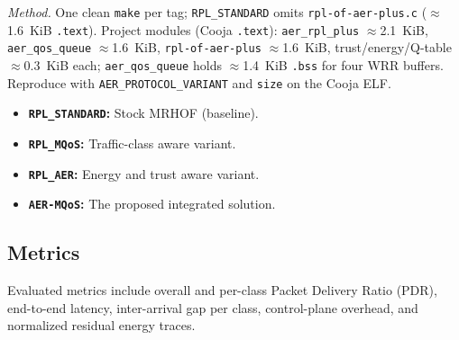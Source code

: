 \begin{aertablecol}[t]
  \caption{Cooja link footprint per firmware tag (\texttt{TARGET=cooja}, campaign metrics enabled). Project-specific objects sum to $\approx$8.6~KiB \texttt{.text} for shared modules; full image includes Contiki-NG + \texttt{rpl-lite}.}
  \label{tab:footprint}
  \begingroup\setlength{\tabcolsep}{2.5pt}%
  \endgroup
\end{aertablecol}

\noindent\textit{Method.} One clean \texttt{make} per tag; \texttt{RPL\_STANDARD} omits \texttt{rpl-of-aer-plus.c} ($\approx$1.6~KiB \texttt{.text}). Project modules (Cooja \texttt{.text}): \texttt{aer\_rpl\_plus} $\approx$2.1~KiB, \texttt{aer\_qos\_queue} $\approx$1.6~KiB, \texttt{rpl-of-aer-plus} $\approx$1.6~KiB, trust/energy/Q-table $\approx$0.3~KiB each; \texttt{aer\_qos\_queue} holds $\approx$1.4~KiB \texttt{.bss} for four WRR buffers. Reproduce with \texttt{AER\_PROTOCOL\_VARIANT} and \texttt{size} on the Cooja ELF.

\begin{itemize}
  \item \textbf{\texttt{RPL\_STANDARD}:} Stock MRHOF (baseline).
  \item \textbf{\texttt{RPL\_MQoS}:} Traffic-class aware variant.
  \item \textbf{\texttt{RPL\_AER}:} Energy and trust aware variant.
  \item \textbf{\texttt{AER-MQoS}:} The proposed integrated solution.
\end{itemize}

\subsection{Metrics}
Evaluated metrics include overall and per-class Packet Delivery Ratio (PDR), end-to-end latency, inter-arrival gap per class, control-plane overhead, and normalized residual energy traces.

